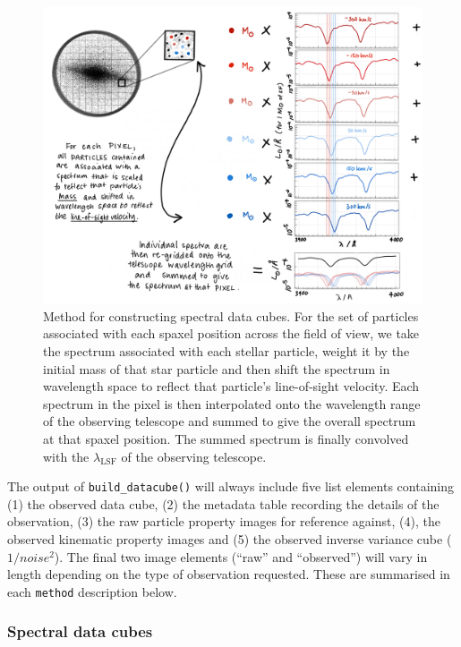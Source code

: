 \documentclass[
  journal=pasa,
  manuscript=research-paper, %
  year=2020,
  volume=37,
]{cup-journal}
\newcommand{\builddatacube}[1]{\texttt{build\_datacube()}#1}
\begin{document}
\begin{figure}
    \centering
    \includegraphics[keepaspectratio, width=13cm]{spectral_mode_methodology.png}
    \caption{Method for constructing spectral data cubes. For the set of particles associated with each spaxel position across the field of view, we take the spectrum associated with each stellar particle, weight it by the initial mass of that star particle and then shift the spectrum in wavelength space to reflect that particle's line-of-sight velocity. Each spectrum in the pixel is then interpolated onto the wavelength range of the observing telescope and summed to give the overall spectrum at that spaxel position. The summed spectrum is finally convolved with the $\lambda_{\text{LSF}}$ of the observing telescope.}
    \label{fig:spectral_methodology}
\end{figure}

The output of \builddatacube{} will always include five list elements containing (1) the observed data cube, (2) the metadata table recording the details of the observation, (3) the raw particle property images for reference against, (4), the observed kinematic property images and (5) the observed inverse variance cube ($1/noise^2$).
The final two image elements (``raw'' and ``observed'')  will vary in length depending on the type of observation requested. 
These are summarised in each \texttt{method} description below. 

\subsubsection{Spectral data cubes} \label{sec:spectral_cubes}
\end{document}
